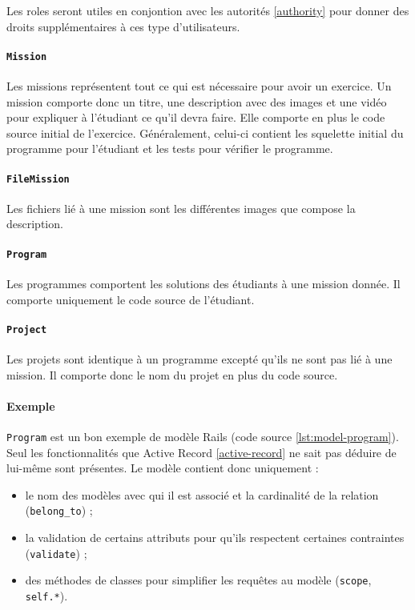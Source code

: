 Les roles seront utiles en conjontion avec les autorités \ref{authority} pour donner des droits supplémentaires à ces type d'utilisateurs.
\paragraph{\texttt{Mission}} Les missions représentent tout ce qui est nécessaire pour avoir un exercice. Un mission comporte donc un titre, une description avec des images et une vidéo pour expliquer à l'étudiant ce qu'il devra faire. Elle comporte en plus le code source initial de l'exercice. Généralement, celui-ci contient les squelette initial du programme pour l'étudiant et les tests pour vérifier le programme. 
\paragraph{\texttt{FileMission}} Les fichiers lié à une mission sont les différentes images que compose la description. %
\paragraph{\texttt{Program}} Les programmes comportent les solutions des étudiants à une mission donnée. Il comporte uniquement le code source de l'étudiant.
\paragraph{\texttt{Project}} Les projets sont identique à un programme excepté qu'ils ne sont pas lié à une mission. Il comporte donc le nom du projet en plus du code source.

\paragraph{Exemple} \texttt{Program} est un bon exemple de modèle Rails (code source \ref{lst:model-program}). Seul les fonctionnalités que Active Record \ref{active-record} ne sait pas déduire de lui-même sont présentes. Le modèle contient donc uniquement :
\begin{itemize}
  \item le nom des modèles avec qui il est associé et la cardinalité de la relation (\texttt{belong\_to}) ;
  \item la validation de certains attributs pour qu'ils respectent certaines contraintes (\texttt{validate}) ;
  \item des méthodes de classes pour simplifier les requêtes au modèle (\texttt{scope}, \texttt{self.*}).
\end{itemize}

